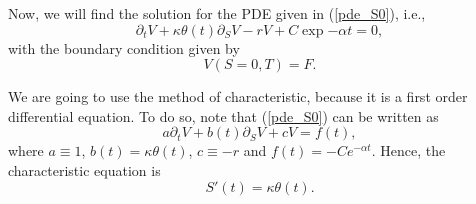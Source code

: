 Now, we will find the solution for the PDE given in (\ref{pde_S0}), i.e., 
\begin{equation}
	\partial_t V + \kappa \theta(t) \partial_S V - r V + C \exp{-\alpha t} = 0,
\end{equation}
with the boundary condition given by 
\begin{equation}
	V(S=0,T) = F.
\end{equation}

We are going to use the method of characteristic, because it is a first order differential equation. To do so, note that (\ref{pde_S0}) can be written as
\begin{equation}
	a \partial_t V + b(t) \partial_S V + c V = f(t),
\end{equation}
where $a \equiv 1$, $b(t) = \kappa \theta(t)$, $c\equiv -r$ and $f(t) = -Ce^{-\alpha t}$. Hence, the characteristic equation is
\begin{equation}\label{char_eq}
	S'(t) = \kappa  \theta(t).
\end{equation}

